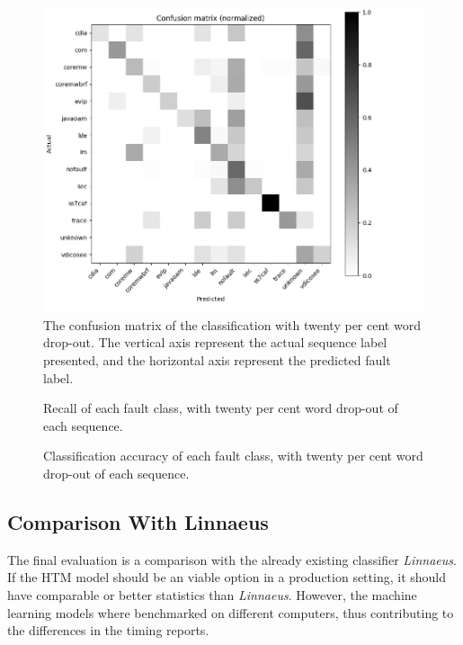 \begin{figure}[H]
    \centering
    \includegraphics[width=\textwidth]{results/figures/256_32_20pcterror_v2.png}
    \vspace{-1cm}
    \caption{The confusion matrix of the classification with twenty per cent word drop-out. The vertical axis represent the actual sequence label presented, and the horizontal axis represent the predicted fault label.}
    \label{fig:20confmatrix}
\end{figure}

\raggedbottom



\begin{figure}[H]
  \centering
    \scalebox{.61}{}
    \caption{Recall of each fault class, with twenty per cent word drop-out of each sequence.}
    \label{fig:recall20}

    \vspace*{\floatsep}

    \scalebox{.61}{}
    \caption{Classification accuracy of each fault class, with twenty per cent word drop-out of each sequence.}
    \label{fig:acc20}
\end{figure}



\subsection{Comparison With Linnaeus}
The final evaluation is a comparison with the already existing classifier \textit{Linnaeus}. If the HTM model should be an viable option in a production setting, it should have comparable or better statistics than \textit{Linnaeus}. However, the machine learning models where benchmarked on different computers, thus contributing to the differences in the timing reports.

